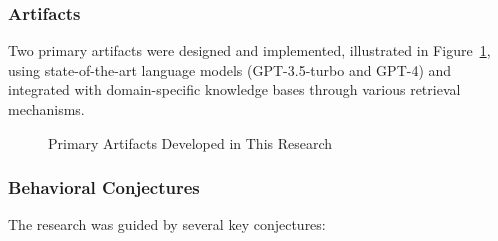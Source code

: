         \subsubsection{Artifacts}
        
        Two primary artifacts were designed and implemented, illustrated in Figure~\ref{fig:artifacts}, using state-of-the-art language models (GPT-3.5-turbo and GPT-4) and integrated with domain-specific knowledge bases through various retrieval mechanisms.
        
        \begin{figure}[h]
        \centering
        \begin{minipage}{0.45\textwidth}
            \centering
        \end{minipage}
        \hfill
        \begin{minipage}{0.45\textwidth}
            \centering
        \end{minipage}
        \caption{Primary Artifacts Developed in This Research}
        \label{fig:artifacts}
        \end{figure}
        
        
        \subsubsection{Behavioral Conjectures}
        
        The research was guided by several key conjectures:
        
